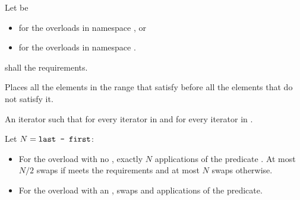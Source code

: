 \begin{itemdescr}
\begin{addedblock}
\pnum
Let  be
\begin{itemize}
\item {} for the overloads in namespace , or
\item {} for the overloads in
  namespace .
\end{itemize}
\end{addedblock}

\pnum
\requires
{}  shall 
 the
 requirements.

\pnum
\effects Places all the elements in the range  that satisfy
  before all the elements that
do not satisfy it.

\pnum
\returns An iterator  such that
for every iterator  in  
and  for every iterator  in
 .

\pnum
\complexity Let $N = \texttt{last - first}$:
\begin{itemize}
\item For the overload with no ,
exactly $N$ applications of the predicate .
At most $N / 2$ swaps if  meets the
 requirements  and at most $N$ swaps otherwise.
\item For the overload with an ,
 swaps and  applications of the predicate.
\end{itemize}
\end{itemdescr}

